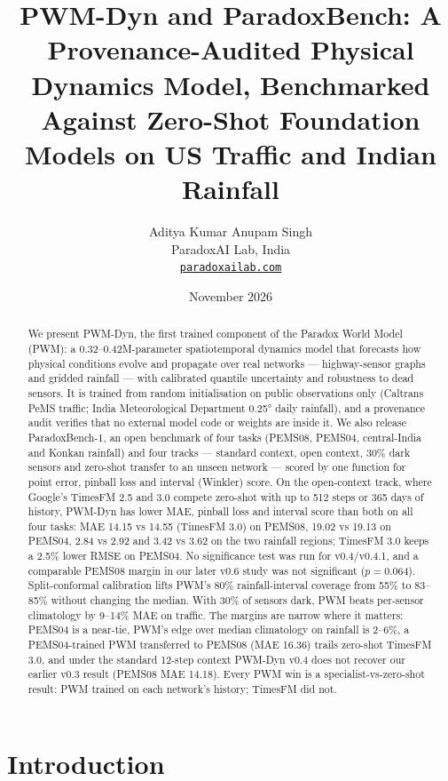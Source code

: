 \documentclass[
  10pt,
]{article}
\title{PWM-Dyn and ParadoxBench: A Provenance-Audited Physical Dynamics
Model, Benchmarked Against Zero-Shot Foundation Models on US Traffic and
Indian Rainfall}
\author{Aditya Kumar \qquad Anupam Singh\\[3pt] \small ParadoxAI Lab, India\\ \small \href{https://paradoxailab.com}{\texttt{paradoxailab.com}}}
\date{November 2026}
\begin{document}
\maketitle
\begin{abstract}
We present PWM-Dyn, the first trained component of the Paradox World
Model (PWM): a 0.32--0.42M-parameter spatiotemporal dynamics model that
forecasts how physical conditions evolve and propagate over real
networks --- highway-sensor graphs and gridded rainfall --- with
calibrated quantile uncertainty and robustness to dead sensors. It is
trained from random initialisation on public observations only (Caltrans
PeMS traffic; India Meteorological Department 0.25° daily rainfall), and
a provenance audit verifies that no external model code or weights are
inside it. We also release ParadoxBench-1, an open benchmark of four
tasks (PEMS08, PEMS04, central-India and Konkan rainfall) and four
tracks --- standard context, open context, 30\% dark sensors and
zero-shot transfer to an unseen network --- scored by one function for
point error, pinball loss and interval (Winkler) score. On the
open-context track, where Google's TimesFM 2.5 and 3.0 compete zero-shot
with up to 512 steps or 365 days of history, PWM-Dyn has lower MAE,
pinball loss and interval score than both on all four tasks: MAE 14.15
vs 14.55 (TimesFM 3.0) on PEMS08, 19.02 vs 19.13 on PEMS04, 2.84 vs 2.92
and 3.42 vs 3.62 on the two rainfall regions; TimesFM 3.0 keeps a 2.5\%
lower RMSE on PEMS04. No significance test was run for v0.4/v0.4.1, and a comparable
PEMS08 margin in our later v0.6 study was not significant ($p=0.064$). Split-conformal calibration lifts PWM's 80\%
rainfall-interval coverage from 55\% to 83--85\% without changing the
median. With 30\% of sensors dark, PWM beats per-sensor climatology by
9--14\% MAE on traffic. The margins are narrow where it matters: PEMS04
is a near-tie, PWM's edge over median climatology on rainfall is 2--6\%,
a PEMS04-trained PWM transferred to PEMS08 (MAE 16.36) trails zero-shot
TimesFM 3.0, and under the standard 12-step context PWM-Dyn v0.4 does
not recover our earlier v0.3 result (PEMS08 MAE 14.18). Every PWM win is
a specialist-vs-zero-shot result: PWM trained on each network's history;
TimesFM did not.
\end{abstract}


\section{Introduction}
\end{document}
